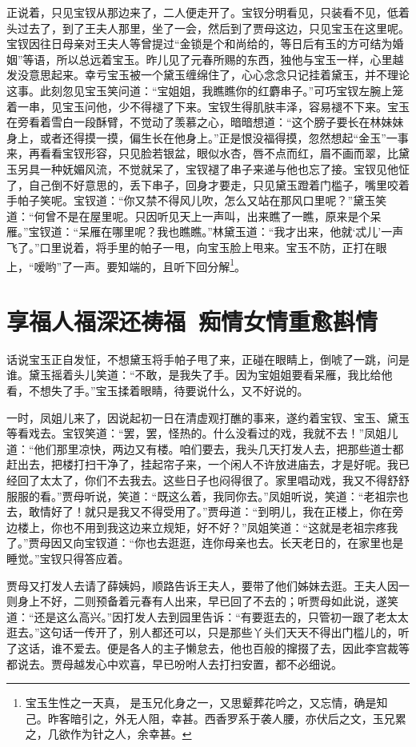 \documentclass[12pt,oneside]{book}
\begin{document}
正说着，只见宝钗从那边来了，二人便走开了。宝钗分明看见，只装看不见，低着头过去了，到了王夫人那里，坐了一会，然后到了贾母这边，只见宝玉在这里呢。宝钗因往日母亲对王夫人等曾提过“金锁是个和尚给的，等日后有玉的方可结为婚姻”等语，所以总远着宝玉。昨儿见了元春所赐的东西，独他与宝玉一样，心里越发没意思起来。幸亏宝玉被一个黛玉缠绵住了，心心念念只记挂着黛玉，并不理论这事。此刻忽见宝玉笑问道：“宝姐姐，我瞧瞧你的红麝串子。”可巧宝钗左腕上笼着一串，见宝玉问他，少不得褪了下来。宝钗生得肌肤丰泽，容易褪不下来。宝玉在旁看着雪白一段酥臂，不觉动了羡慕之心，暗暗想道：“这个膀子要长在林妹妹身上，或者还得摸一摸，偏生长在他身上。”正是恨没福得摸，忽然想起“金玉”一事来，再看看宝钗形容，只见脸若银盆，眼似水杏，唇不点而红，眉不画而翠，比黛玉另具一种妩媚风流，不觉就呆了，宝钗褪了串子来递与他也忘了接。宝钗见他怔了，自己倒不好意思的，丢下串子，回身才要走，只见黛玉蹬着门槛子，嘴里咬着手帕子笑呢。宝钗道：“你又禁不得风儿吹，怎么又站在那风口里呢？”黛玉笑道：“何曾不是在屋里呢。只因听见天上一声叫，出来瞧了一瞧，原来是个呆雁。”宝钗道：“呆雁在哪里呢？我也瞧瞧。”林黛玉道：“我才出来，他就‘忒儿’一声飞了。”口里说着，将手里的帕子一甩，向宝玉脸上甩来。宝玉不防，正打在眼上，“嗳哟”了一声。要知端的，且听下回分解\footnote{宝玉生性之一天真， 是玉兄化身之一，又思颦葬花吟之，又忘情，确是知己。昨客暗引之，外无人阻，幸甚。西香罗系于袭人腰，亦伏后之文，玉兄累之，几欲作为针之人，余幸甚。}。


 
\chapter{享福人福深还祷福~痴情女情重愈斟情}
话说宝玉正自发怔，不想黛玉将手帕子甩了来，正碰在眼睛上，倒唬了一跳，问是谁。黛玉摇着头儿笑道：“不敢，是我失了手。因为宝姐姐要看呆雁，我比给他看，不想失了手。”宝玉揉着眼睛，待要说什么，又不好说的。

一时，凤姐儿来了，因说起初一日在清虚观打醮的事来，遂约着宝钗、宝玉、黛玉等看戏去。宝钗笑道：“罢，罢，怪热的。什么没看过的戏，我就不去！”凤姐儿道：“他们那里凉快，两边又有楼。咱们要去，我头几天打发人去，把那些道士都赶出去，把楼打扫干净了，挂起帘子来，一个闲人不许放进庙去，才是好呢。我已经回了太太了，你们不去我去。这些日子也闷得很了。家里唱动戏，我又不得舒舒服服的看。”贾母听说，笑道：“既这么着，我同你去。”凤姐听说，笑道：“老祖宗也去，敢情好了！就只是我又不得受用了。”贾母道：“到明儿，我在正楼上，你在旁边楼上，你也不用到我这边来立规矩，好不好？”凤姐笑道：“这就是老祖宗疼我了。”贾母因又向宝钗道：“你也去逛逛，连你母亲也去。长天老日的，在家里也是睡觉。”宝钗只得答应着。

贾母又打发人去请了薛姨妈，顺路告诉王夫人，要带了他们姊妹去逛。王夫人因一则身上不好，二则预备着元春有人出来，早已回了不去的；听贾母如此说，遂笑道：“还是这么高兴。”因打发人去到园里告诉：“有要逛去的，只管初一跟了老太太逛去。”这句话一传开了，别人都还可以，只是那些丫头们天天不得出门槛儿的，听了这话，谁不爱去。便是各人的主子懒怠去，他也百般的撺掇了去，因此李宫裁等都说去。贾母越发心中欢喜，早已吩咐人去打扫安置，都不必细说。
\end{document}
